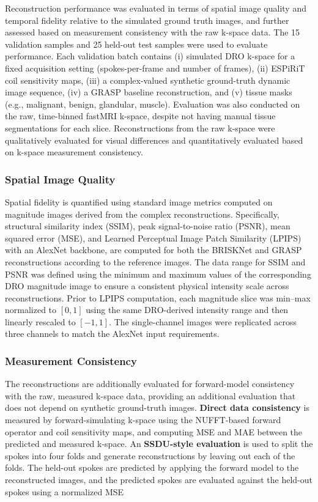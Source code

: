 \documentclass[runningheads]{llncs}
\begin{document}
Reconstruction performance was evaluated in terms of spatial image quality and temporal fidelity relative to the simulated ground truth images, and further assessed based on measurement consistency with the raw k-space data. The 15 validation samples and 25 held-out test samples were used to evaluate performance. Each validation batch contains (i) simulated DRO k-space for a fixed acquisition setting (spokes-per-frame and number of frames), (ii) ESPiRiT coil sensitivity maps, (iii) a complex-valued synthetic ground-truth dynamic image sequence, (iv) a GRASP baseline reconstruction, and (v) tissue masks (e.g., malignant, benign, glandular, muscle). Evaluation was also conducted on the raw, time-binned fastMRI k-space, despite not having manual tissue segmentations for each slice. Reconstructions from the raw k-space were qualitatively evaluated for visual differences and quantitatively evaluated based on k-space measurement consistency.



\subsubsection{Spatial Image Quality}

Spatial fidelity is quantified using standard image metrics computed on magnitude images derived from the complex reconstructions. Specifically, structural similarity index (SSIM), peak signal-to-noise ratio (PSNR), mean squared error (MSE), and Learned Perceptual Image Patch Similarity (LPIPS) with an AlexNet backbone, are computed for both the BRISKNet and GRASP reconstructions according to the reference images. The data range for SSIM and PSNR was defined using the minimum and maximum values of the corresponding DRO magnitude image to ensure a consistent physical intensity scale across reconstructions. Prior to LPIPS computation, each magnitude slice was min–max normalized to $[0,1]$ using the same DRO-derived intensity range and then linearly rescaled to $[-1,1]$. The single-channel images were replicated across three channels to match the AlexNet input requirements.

\subsubsection{Measurement Consistency}

The reconstructions are additionally evaluated for forward-model consistency with the raw, measured k-space data, providing an additional evaluation that does not depend on synthetic ground-truth images. \textbf{Direct data consistency} is measured by forward-simulating k-space using the NUFFT-based forward operator and coil sensitivity maps, and computing MSE and MAE between the predicted and measured k-space. An \textbf{SSDU-style evaluation} is used to split the spokes into four folds and generate reconstructions by leaving out each of the folds. The held-out spokes are predicted by applying the forward model to the reconstructed images, and the predicted spokes are evaluated against the held-out spokes using a normalized MSE
\end{document}
